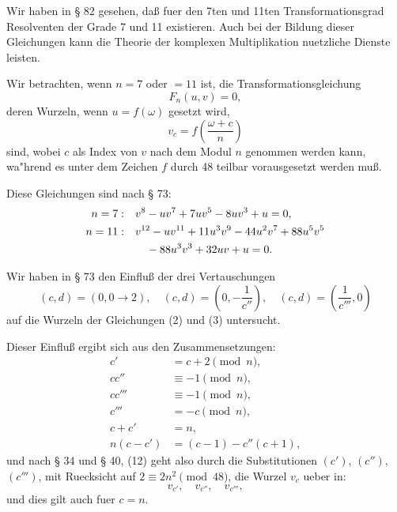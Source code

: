 \documentclass[12pt,a4paper]{article}
\theoremstyle{plain}
\theoremstyle{definition}
\theoremstyle{remark}
\begin{document}
Wir haben in \S{} 82 gesehen, da\ss{} fuer den 7ten und 11ten Transformationsgrad Resolventen der Grade 7 und 11 existieren. Auch bei der Bildung dieser Gleichungen kann die Theorie der komplexen Multiplikation nuetzliche Dienste leisten.

Wir betrachten, wenn $n = 7$ oder $= 11$ ist, die Transformationsgleichung
\[
F_n(u, v) = 0,
\]
deren Wurzeln, wenn $u = f(\omega)$ gesetzt wird,
\begin{equation}\label{eq:133_1}
v_c = f\left(\frac{\omega + c}{n}\right)
\end{equation}
sind, wobei $c$ als Index von $v$ nach dem Modul $n$ genommen werden kann, wa"hrend es unter dem Zeichen $f$ durch 48 teilbar vorausgesetzt werden mu\ss{}.

Diese Gleichungen sind nach \S{} 73:
\begin{align}
n = 7: & \quad v^8 - uv^7 + 7uv^5 - 8uv^3 + u = 0, \label{eq:133_2}\\
n = 11: & \quad v^{12} - uv^{11} + 11u^3 v^9 - 44u^2 v^7 + 88u^5 v^5 \notag\\
         & \qquad - 88u^3 v^3 + 32uv + u = 0. \label{eq:133_3}
\end{align}

Wir haben in \S{} 73 den Einflu\ss{} der drei Vertauschungen
\begin{equation}\label{eq:133_4}
(c, d) = (0, 0 \to 2), \quad (c, d) = \left(0, -\frac{1}{c''}\right), \quad (c, d) = \left(\frac{1}{c'''}, 0\right)
\end{equation}
auf die Wurzeln der Gleichungen (2) und (3) untersucht.

Dieser Einflu\ss{} ergibt sich aus den Zusammensetzungen:
\begin{align}
c' &= c + 2 \pmod{n}, \label{eq:133_5}\\
c c'' &\equiv -1 \pmod{n}, \label{eq:133_6}\\
c c''' &\equiv -1 \pmod{n}, \label{eq:133_7}\\
c''' &= -c \pmod{n}, \label{eq:133_8}\\
c + c' &= n, \label{eq:133_9}\\
n(c - c') &= (c - 1) - c''(c + 1), \label{eq:133_10}
\end{align}
und nach \S{} 34 und \S{} 40, (12) geht also durch die Substitutionen $(c')$, $(c'')$, $(c''')$, mit Ruecksicht auf $2 \equiv 2n^2 \pmod{48}$, die Wurzel $v_c$ ueber in:
\begin{equation}\label{eq:133_11}
v_{c'}, \quad v_{c''}, \quad v_{c'''},
\end{equation}
und dies gilt auch fuer $c = n$.
\end{document}
